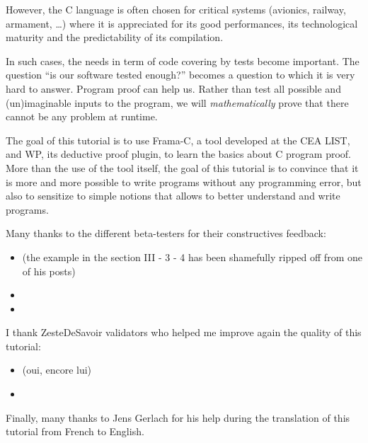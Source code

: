 \documentclass[middle]{zmdocument}
\begin{document}
However, the C language is often chosen for critical systems (avionics,
railway, armament, \ldots{}) where it is appreciated for its good
performances, its technological maturity and the predictability of its
compilation.



In such cases, the needs in term of code covering by tests become
important. The question ``is our software tested enough?'' becomes a
question to which it is very hard to answer. Program proof can help us.
Rather than test all possible and (un)imaginable inputs to the program,
we will \emph{mathematically} prove that there cannot be any problem at
runtime.



The goal of this tutorial is to use Frama-C, a tool developed at the CEA
LIST, and WP, its deductive proof plugin, to learn the basics about C
program proof. More than the use of the tool itself, the goal of this
tutorial is to convince that it is more and more possible to write
programs without any programming error, but also to sensitize to simple
notions that allows to better understand and write programs.



\begin{Information}
  Many thanks to the different beta-testers for their constructives
  feedback:

\begin{itemize}
\item {} (the
    example in the section III - 3 - 4 has been shamefully ripped
    off from one of his posts)
\item {}
\item {}
\end{itemize}
  I thank ZesteDeSavoir validators who helped me improve again the quality of
  this tutorial:

\begin{itemize}
\item {} (oui, encore lui)
\item {}
\end{itemize}
  Finally, many thanks to Jens Gerlach for his help during the translation of
  this tutorial from French to English.
\end{Information}
\end{document}
